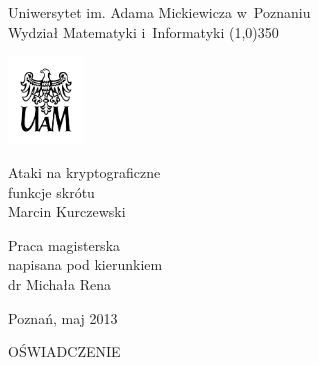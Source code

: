 \documentclass[12pt,a4paper,twoside]{article}
\begin{document}
\onehalfspacing
\newcommand{\myparagraph}[1]{\paragraph{#1}\mbox{}\\}
\newcommand{\latin}[1]{\foreignlanguage{latin}{\textit{#1}}}
\newcommand{\en}[1]{\textit{\enn{#1}}}
\newcommand{\enn}[1]{\foreignlanguage{english}{#1}}
\newcommand{\abbr}[1]{\textit{#1}}
\newenvironment{myenumerate}
    {\begin{enumerate}[label*=\arabic*.]}
    {\end{enumerate}}
\DeclarePairedDelimiter{\ceil}{\lceil}{\rceil}
\DeclarePairedDelimiter{\floor}{\lfloor}{\rfloor}

\begin{titlepage}
    \begin{center}
    {\LARGE Uniwersytet im. Adama Mickiewicza w~Poznaniu \\
    Wydział Matematyki i~Informatyki}
    \line(1,0){350}

    \vspace{1cm}
    \includegraphics[width=2cm]{logo-uam/logo-uam.png}
    \vspace{1cm}

    \vspace{1cm}
    {\Huge Ataki na kryptograficzne \\ funkcje skrótu} \\[0.5cm]
    {\Large Marcin Kurczewski}
    \end{center}

    \vspace{3cm}
    \hspace{8cm}\parbox[l]{6cm}{\Large Praca magisterska \\
    napisana pod kierunkiem \\
    dr Michała Rena}

    \begin{center}
    \vspace{4cm}
    Poznań, maj 2013
    \end{center}
\end{titlepage}


\newpage
\thispagestyle{empty}
\begin{center}
    OŚWIADCZENIE
\end{center}
\end{document}
